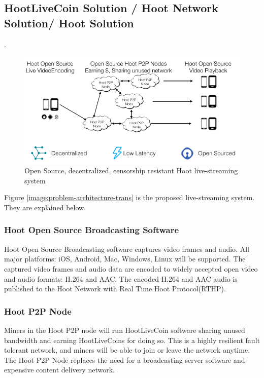 \documentclass{article}
\begin{document}
\subsection{HootLiveCoin Solution / Hoot Network Solution/ Hoot Solution}
 .

\begin{figure}[h!]
 \centering
 \includegraphics[width=1.0\textwidth]{static/hoot-solution-trans}
 \caption{Open Source, decentralized, censorship resistant Hoot live-streaming system}
 \label{image:hoot-solution-trans}
\end{figure}


Figure \ref{image:problem-architecture-trans} is the proposed live-streaming system. They are explained below.
\subsubsection{Hoot Open Source Broadcasting Software}
Hoot Open Source Broadcasting software captures video frames and audio. All major platforms: iOS, Android, Mac, Windows, Linux will be supported. The captured video frames and audio data are encoded to widely accepted open video and audio formats: H.264 and AAC. The encoded H.264 and AAC audio is published to the Hoot Network with Real Time Hoot Protocol(RTHP).

\subsubsection{Hoot P2P Node}
Miners in the Hoot P2P node will run HootLiveCoin software sharing unused bandwidth and earning HootLiveCoins for doing so. This is a highly resilient fault tolerant network, and miners will be able to join or leave the network anytime. The Hoot P2P Node replaces the need for a broadcasting server software and expensive content delivery network.
\end{document}
